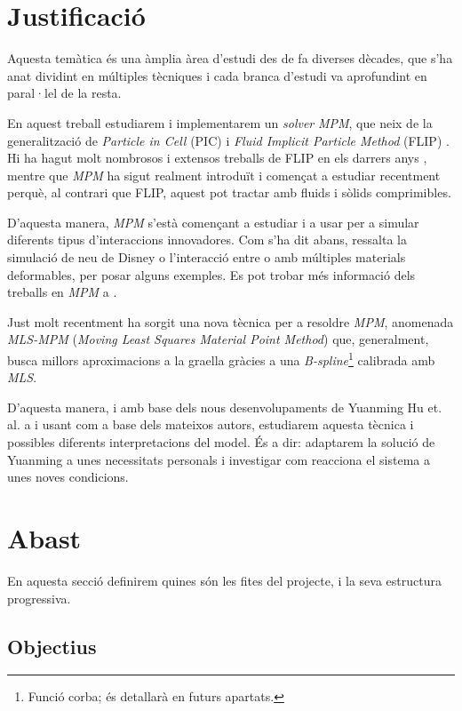 \documentclass[a4paper]{report}
\begin{document}
	\section{Justificació}
	Aquesta temàtica és una àmplia àrea d'estudi des de fa diverses dècades, que s'ha anat dividint en múltiples tècniques i cada branca d'estudi va aprofundint en paral·lel de la resta.
	\par
	En aquest treball estudiarem i implementarem un \textit{solver} \textit{MPM}, que neix de la generalització de \textit{Particle in Cell} (PIC) i \textit{Fluid Implicit Particle Method} (FLIP) \cite{Sulsky1995}. Hi ha hagut molt nombrosos i extensos treballs de FLIP en els darrers anys \cite{Bridson2018,Zhu2005}, mentre que \textit{MPM} ha sigut realment introduït i començat a estudiar recentment perquè, al contrari que FLIP, aquest pot tractar amb fluids i sòlids comprimibles.
	\par
	D'aquesta manera, \textit{MPM} s'està començant a estudiar i a usar per a simular diferents tipus d'interaccions innovadores. Com s'ha dit abans, ressalta la simulació de neu de Disney \cite{Stomakhin} o l'interacció entre o amb múltiples materials deformables\cite{Hegemann2013}, per posar alguns exemples. Es pot trobar més informació dels treballs en \textit{MPM} a \cite{Jiang2016}.
	\par
	Just molt recentment ha sorgit una nova tècnica per a resoldre \textit{MPM}, anomenada \textit{MLS-MPM} (\textit{Moving Least Squares Material Point Method})\cite{hu2018mlsmpmcpic} que, generalment, busca millors aproximacions a la graella gràcies a una \textit{B-spline}\footnote{Funció corba; és detallarà en futurs apartats.} calibrada amb \textit{MLS}.
	\par
	D'aquesta manera, i amb base dels nous desenvolupaments de Yuanming Hu et. al. a \cite{hu2018mlsmpmcpic} i usant com a base \cite{Hu} dels mateixos autors, estudiarem aquesta tècnica i possibles diferents interpretacions del model. És a dir: adaptarem la solució de Yuanming a unes necessitats personals i investigar com reacciona el sistema a unes noves condicions.
	
	\section{Abast}
	En aquesta secció definirem quines són les fites del projecte, i la seva estructura progressiva.
	\subsection{Objectius}
\end{document}
